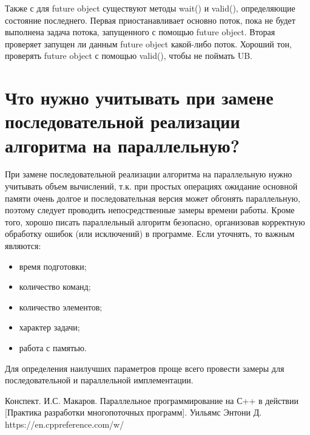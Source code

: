 \documentclass[a4paper,12pt]{article}	%
\begin{document}
	Также с для future object существуют методы wait() и valid(), определяющие состояние последнего. Первая приостанавливает основно поток, пока не будет выполнена задача потока, запущенного с помощью future object. Вторая проверяет запущен ли данным future object какой-либо поток. Хороший тон, проверять future object с помощью valid(), чтобы не поймать UB.

\section{Что нужно учитывать при замене последовательной реализации алгоритма на параллельную?}

	При замене последовательной реализации алгоритма на параллельную нужно учитывать объем вычислений, т.к. при простых операциях ожидание основной памяти очень долгое и последовательная версия может обгонять параллельную, поэтому следует проводить непосредственные замеры времени работы. Кроме того, хорошо писать параллельный алгоритм безопасно, организовав корректную обработку ошибок (или исключений) в программе. Если уточнять, то важным являются: 
	
	\begin{itemize}
	
		\item время подготовки;		
		\item количество команд;		
		\item количество элементов;
		\item характер задачи;
		\item работа с памятью.
	
	\end{itemize}
	
	Для определения наилучших параметров проще всего провести замеры для последовательной и параллельной имплементации.
			
\newpage

	
 
	\begin{thebibliography}{}
	
		 Конспект. И.С. Макаров.
		 Параллельное программирование на С++ в действии [Практика разработки многопоточных программ]. Уильямс Энтони Д.
		 https://en.cppreference.com/w/
		
	\end{thebibliography}
\end{document}
